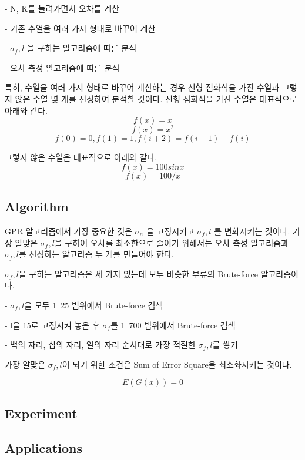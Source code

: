 \documentclass{sig-alternate-05-2015}
\begin{document}
\begin{CJK}{UTF8}{mj}
- N, K를 늘려가면서 오차를 계산

- 기존 수열을 여러 가지 형태로 바꾸어 계산

- $\sigma_f, l$ 을 구하는 알고리즘에 따른 분석

- 오차 측정 알고리즘에 따른 분석

특히, 수열을 여러 가지 형태로 바꾸어 계산하는 경우 선형 점화식을 가진 수열과 그렇지 않은 수열 몇 개를 선정하여 분석할 것이다. 선형 점화식을 가진 수열은 대표적으로 아래와 같다.
\begin{equation} f(x) = x \end{equation}
\begin{equation} f(x) = x^2 \end{equation}
\begin{equation} f(0)=0, f(1)=1, f(i+2)=f(i+1)+f(i) \end{equation}

그렇지 않은 수열은 대표적으로 아래와 같다.
\begin{equation} f(x) = 100 sin{x} \end{equation}
\begin{equation} f(x) = 100/x \end{equation}


\subsection{Algorithm}
GPR 알고리즘에서 가장 중요한 것은 $\sigma_n$ 을 고정시키고 $\sigma_f, l$ 를 변화시키는 것이다. 가장 알맞은 $\sigma_f, l$을 구하여 오차를 최소한으로 줄이기 위해서는 오차 측정 알고리즘과 $\sigma_f, l$를 선정하는 알고리즘 두 개를 만들어야 한다.

$\sigma_f, l$을 구하는 알고리즘은 세 가지 있는데 모두 비슷한 부류의 Brute-force 알고리즘이다.

- $\sigma_f, l$을 모두 1~25 범위에서 Brute-force 검색

- l을 15로 고정시켜 놓은 후  $\sigma_f$를 1~700 범위에서 Brute-force 검색

- 백의 자리, 십의 자리, 일의 자리 순서대로 가장 적절한 $\sigma_f, l$를 쌓기

가장 알맞은 $\sigma_f, l$이 되기 위한 조건은 Sum of Error Square을 최소화시키는 것이다.

\begin{equation} E(G(x)) = 0 \end{equation}

\subsection{Experiment}
\subsection{Applications}
\end{CJK}
\end{document}
